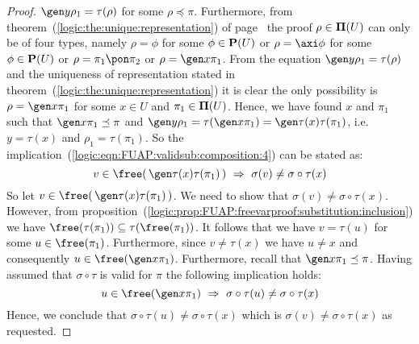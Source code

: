 \begin{proof}
$\gen y\rho_{1}=\tau(\rho)$ for some $\rho\preceq\pi$. Furthermore,
from theorem~(\ref{logic:the:unique:representation}) of
page~\pageref{logic:the:unique:representation} the proof
$\rho\in{\bf\Pi}(U)$ can only be of four types, namely $\rho=\phi$
for some $\phi\in{\bf P}(U)$ or $\rho=\axi\phi$ for some
$\phi\in{\bf P}(U)$ or $\rho=\pi_{1}\pon\pi_{2}$ or $\rho=\gen
x\pi_{1}$. From the equation $\gen y\rho_{1}=\tau(\rho)$ and the
uniqueness of representation stated in
theorem~(\ref{logic:the:unique:representation}) it is clear the only
possibility is $\rho=\gen x\pi_{1}$ for some $x\in U$ and
$\pi_{1}\in{\bf\Pi}(U)$. Hence, we have found $x$ and $\pi_{1}$ such
that $\gen x\pi_{1}\preceq\pi$ and $\gen y\rho_{1}=\tau(\gen
x\pi_{1})=\gen\tau(x)\tau(\pi_{1})$, i.e. $y=\tau(x)$ and
$\rho_{1}=\tau(\pi_{1})$. So the
implication~(\ref{logic:eqn:FUAP:validsub:composition:4}) can be
stated as:
    \begin{equation}\label{logic:eqn:FUAP:validsub:composition:5}
    v\in\free(\,\gen\tau(x)\tau(\pi_{1})\,)\ \Rightarrow\
    \sigma(v)\neq\sigma\circ\tau(x)
    \end{equation}
So let $v\in\free(\,\gen\tau(x)\tau(\pi_{1})\,)$. We need to show
that $\sigma(v)\neq\sigma\circ\tau(x)$. However, from
proposition~(\ref{logic:prop:FUAP:freevarproof:substitution:inclusion})
we have $\free(\tau(\pi_{1}))\subseteq\tau(\free(\pi_{1}))$. It
follows that we have $v=\tau(u)$ for some $u\in\free(\pi_{1})$.
Furthermore, since $v\neq\tau(x)$ we have $u\neq x$ and consequently
$u\in\free(\gen x\pi_{1})$. Furthermore, recall that $\gen
x\pi_{1}\preceq\pi$. Having assumed that $\sigma\circ\tau$ is valid
for $\pi$ the following implication holds:
    \begin{equation}\label{logic:eqn:FUAP:validsub:composition:6}
    u\in\free(\gen x\pi_{1})\ \Rightarrow\
    \sigma\circ\tau(u)\neq\sigma\circ\tau(x)
    \end{equation}
Hence, we conclude that $\sigma\circ\tau(u)\neq\sigma\circ\tau(x)$
which is $\sigma(v)\neq\sigma\circ\tau(x)$ as requested.
\end{proof}

